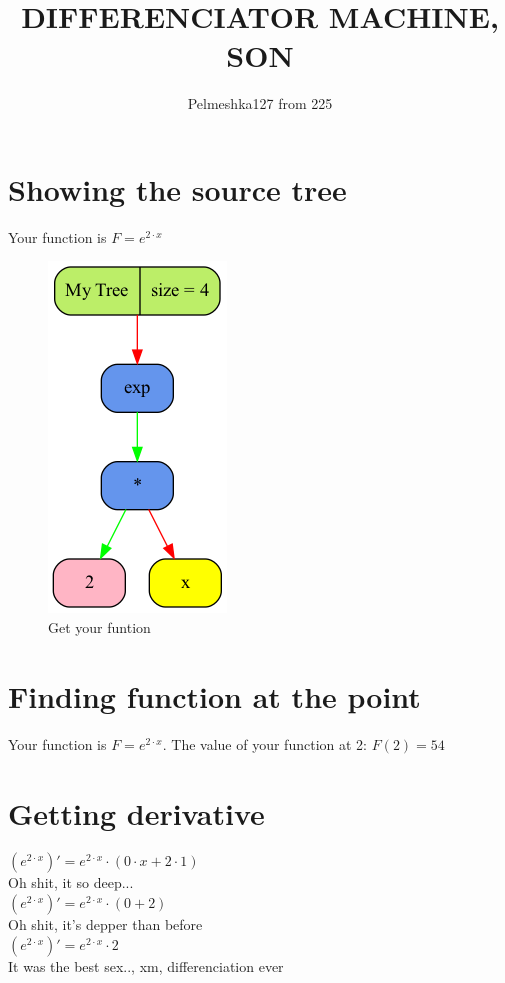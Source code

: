 \documentclass[12pt, letterpaper, twoside]{article}
\title{DIFFERENCIATOR MACHINE, SON}
\author{Pelmeshka127 from 225}
\date{}
\begin{document}
\maketitle
\newpage
\section{Showing the source tree}
\begin{center}
Your function is $F = e^{2 \cdot x}$\newline 
\begin{figure}
\begin{center}
\includegraphics [scale = 0.4]{graphics/graph1.png}
\caption{Get your funtion}
\end{center}
\end{figure}
\end{center}
\newpage
\section{Finding function at the point}
\begin{center}
Your function is $F = e^{2 \cdot x}$.
The value of your function at 2: $ F(2) = 54 $
\end{center}
\newpage
\section{Getting derivative}
\begin{center}
$(e^{2 \cdot x})' = e^{2 \cdot x} \cdot (0 \cdot x + 2 \cdot 1)$\\
Oh shit, it so deep...\\
$(e^{2 \cdot x})' = e^{2 \cdot x} \cdot (0 + 2)$\\
Oh shit, it's depper than before\\
$(e^{2 \cdot x})' = e^{2 \cdot x} \cdot 2$\\
It was the best sex.., xm, differenciation ever
\end{center}
\newpage
\end{document}
